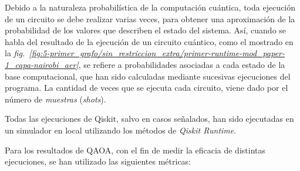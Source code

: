 Debido a la naturaleza probabilística de la computación cuántica, toda ejecución de un circuito se debe realizar varias veces, para obtener una aproximación de la probabilidad de los valores que describen el estado del sistema.
Así, cuando se habla del resultado de la ejecución de un circuito cuántico, como el mostrado en la \textit{fig.~\ref{fig:5-primer_grafo/sin_restriccion_extra/primer-runtime-mod_paper-1_capa-nairobi_aer}},
se refiere a probabilidades asociadas a cada estado de la base computacional, que han sido calculadas mediante sucesivas ejecuciones del programa.
La cantidad de veces que se ejecuta cada circuito, viene dado por el número de \textit{muestras} (\textit{shots}).

Todas las ejecuciones de Qiskit, salvo en casos señalados, han sido ejecutadas en un simulador en local utilizando los métodos de \textit{Qiskit Runtime}.

Para los resultados de QAOA, con el fin de medir la eficacia de distintas ejecuciones, se han utilizado las siguientes métricas:

